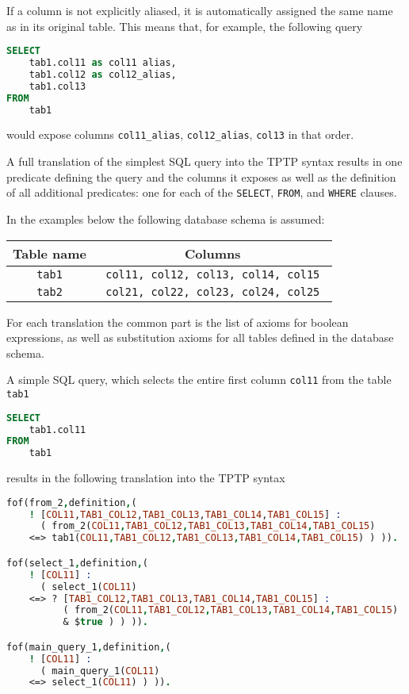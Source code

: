 \documentclass[magisterska,en]{pracamgr}
\newcommand{\code}[1]{\texttt{#1}}
\begin{document}
If a column is not explicitly aliased, it is automatically assigned the same name as in its original table. This means that, for example, the following query
\begin{lstlisting}[language=SQL, caption=Sample \code{SELECT} statement]
SELECT
    tab1.col11 as col11 alias,
    tab1.col12 as col12_alias,
    tab1.col13
FROM
    tab1
\end{lstlisting}
would expose columns \code{col11_alias}, \code{col12_alias}, \code{col13} in that order.

A full translation of the simplest SQL query into the TPTP syntax results in one predicate defining the query and the columns it exposes as well as the definition of all additional predicates: one for each of the \code{SELECT}, \code{FROM}, and \code{WHERE} clauses.

In the examples below the following database schema is assumed:
\renewcommand{\arraystretch}{1.5}
\begin{center}
 \begin{tabular}{ c | c }
 Table name & Columns \\
 \hline
 \code{tab1} & \code{ col11, col12, col13, col14, col15 } \\
  \code{tab2} & \code{ col21, col22, col23, col24, col25 }
\end{tabular}
\end{center}
For each translation the common part is the list of axioms for boolean expressions, as well as substitution axioms for all tables defined in the database schema.


A simple SQL query, which selects the entire first column \code{col11} from the table \code{tab1}

\begin{lstlisting}[language=SQL, caption=SQL query]
SELECT
    tab1.col11
FROM
    tab1
\end{lstlisting}
results in the following translation into the TPTP syntax
\begin{lstlisting}[language=Prolog, caption=TPTP translation]
fof(from_2,definition,(
    ! [COL11,TAB1_COL12,TAB1_COL13,TAB1_COL14,TAB1_COL15] :
      ( from_2(COL11,TAB1_COL12,TAB1_COL13,TAB1_COL14,TAB1_COL15)
    <=> tab1(COL11,TAB1_COL12,TAB1_COL13,TAB1_COL14,TAB1_COL15) ) )).

fof(select_1,definition,(
    ! [COL11] :
      ( select_1(COL11)
    <=> ? [TAB1_COL12,TAB1_COL13,TAB1_COL14,TAB1_COL15] :
          ( from_2(COL11,TAB1_COL12,TAB1_COL13,TAB1_COL14,TAB1_COL15)
          & $true ) ) )).

fof(main_query_1,definition,(
    ! [COL11] :
      ( main_query_1(COL11)
    <=> select_1(COL11) ) )).

\end{lstlisting}
\end{document}
